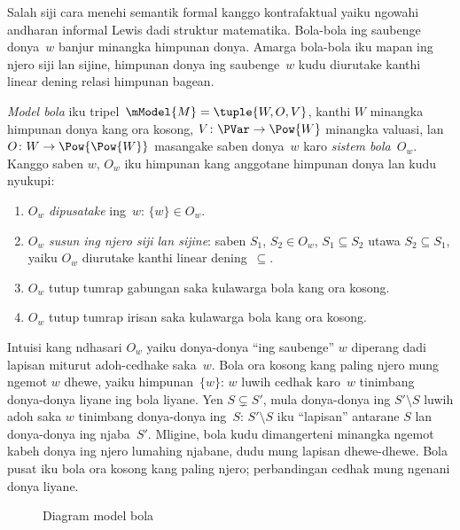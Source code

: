 \documentclass[../../../include/open-logic-section]{subfiles}
\begin{document}


Salah siji cara menehi semantik formal kanggo kontrafaktual
yaiku ngowahi andharan informal Lewis dadi struktur matematika.
Bola-bola ing saubenge donya~$w$ banjur minangka himpunan donya.
Amarga bola-bola iku mapan ing njero siji lan sijine, himpunan
donya ing saubenge~$w$ kudu diurutake kanthi linear dening
relasi himpunan bagean.

\begin{defn}
  \emph{Model bola} iku tripel~$\mModel{M} = \tuple{W, O, V}$,
  kanthi $W$ minangka himpunan donya kang ora kosong,
  $V\colon \PVar \to \Pow{W}$ minangka valuasi, lan
  $O\colon W \to \Pow{\Pow{W}}$ masangake saben donya~$w$
  karo \emph{sistem bola}~$O_w$. Kanggo saben $w$, $O_w$ iku
  himpunan kang anggotane himpunan donya lan kudu nyukupi:
  \begin{enumerate}
  \item $O_w$ \emph{dipusatake} ing~$w$: $\{w\} \in O_w$.
  \item $O_w$ \emph{susun ing njero siji lan sijine}: saben
    $S_1$, $S_2 \in O_w$, $S_1 \subseteq S_2$ utawa
    $S_2 \subseteq S_1$, yaiku $O_w$ diurutake kanthi linear
    dening~$\subseteq$.
  \item $O_w$ tutup tumrap gabungan saka kulawarga bola kang ora kosong.
  \item $O_w$ tutup tumrap irisan saka kulawarga bola kang ora kosong.
  \end{enumerate}
\end{defn}

Intuisi kang ndhasari $O_w$ yaiku donya-donya ``ing saubenge'' $w$
diperang dadi lapisan miturut adoh-cedhake saka~$w$. Bola ora
kosong kang paling njero mung ngemot $w$ dhewe, yaiku
himpunan~$\{w\}$: $w$ luwih cedhak karo~$w$ tinimbang donya-donya
liyane ing bola liyane. Yen $S \subsetneq S'$, mula donya-donya ing
$S' \setminus S$ luwih adoh saka $w$ tinimbang donya-donya
ing~$S$: $S' \setminus S$ iku ``lapisan'' antarane $S$ lan
donya-donya ing njaba~$S'$. Mligine, bola kudu dimangerteni
minangka ngemot kabeh donya ing njero lumahing njabane,
dudu mung lapisan dhewe-dhewe.
Bola pusat iku bola ora kosong kang paling njero; perbandingan cedhak mung ngenani donya liyane.

\begin{figure}
\begin{center}
\caption{Diagram model bola}
\end{center}
\end{figure}
\end{document}
